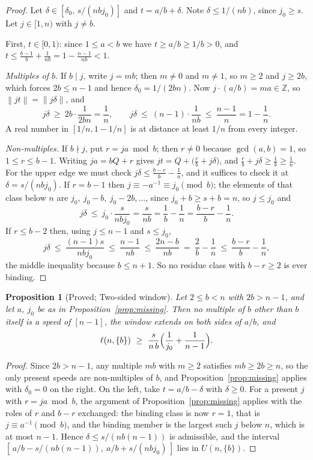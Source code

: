 \documentclass[11pt]{amsart}
\theoremstyle{plain}
\newtheorem{proposition}[theorem]{Proposition}
\theoremstyle{definition}
\newcommand{\nrm}[1]{\left\lVert #1 \right\rVert}
\newcommand{\Z}{\mathbb{Z}}
\begin{document}
\begin{proof}
Let $\delta\in[\delta_0,\,s/(nbj_0)]$ and $t=a/b+\delta$. Note $\delta\le 1/(nb)$, since $j_0\ge s$.
Let $j\in[1,n)$ with $j\ne b$.

First, $t\in[0,1)$: since $1\le a<b$ we have $t\ge a/b\ge 1/b>0$, and
$t\le\frac{b-1}{b}+\frac{1}{nb}=1-\frac{n-1}{nb}<1$.

\emph{Multiples of $b$.} If $b\mid j$, write $j=mb$; then $m\ne0$ and $m\ne1$, so $m\ge2$ and
$j\ge 2b$, which forces $2b\le n-1$ and hence $\delta_0=1/(2bn)$. Now $j\cdot(a/b)=ma\in\Z$, so
$\nrm{jt}=\nrm{j\delta}$, and
\[
  j\delta\ \ge\ 2b\cdot\frac{1}{2bn}=\frac1n,
  \qquad
  j\delta\ \le\ (n-1)\cdot\frac{1}{nb}\ \le\ \frac{n-1}{n}=1-\frac1n .
\]
A real number in $[1/n,1-1/n]$ is at distance at least $1/n$ from every integer.

\emph{Non-multiples.} If $b\nmid j$, put $r=ja\bmod b$; then $r\ne0$ because $\gcd(a,b)=1$, so
$1\le r\le b-1$. Writing $ja=bQ+r$ gives $jt=Q+\bigl(\tfrac rb+j\delta\bigr)$, and
$\tfrac rb+j\delta\ge\tfrac1b\ge\tfrac1n$. For the upper edge we must check
$j\delta\le\frac{b-r}{b}-\frac1n$, and it suffices to check it at $\delta=s/(nbj_0)$.
If $r=b-1$ then $j\equiv -a^{-1}\equiv j_0\pmod b$; the elements of that class below $n$ are
$j_0,\ j_0-b,\ j_0-2b,\dots$, since $j_0+b\ge s+b=n$, so $j\le j_0$ and
\[
  j\delta\ \le\ j_0\cdot\frac{s}{nbj_0}=\frac{s}{nb}=\frac1b-\frac1n=\frac{b-r}{b}-\frac1n .
\]
If $r\le b-2$ then, using $j\le n-1$ and $s\le j_0$,
\[
  j\delta\ \le\ \frac{(n-1)s}{nbj_0}\ \le\ \frac{n-1}{nb}
  \ \le\ \frac{2n-b}{nb}\ =\ \frac2b-\frac1n\ \le\ \frac{b-r}{b}-\frac1n ,
\]
the middle inequality because $b\le n+1$. So no residue class with $b-r\ge2$ is ever binding.
\end{proof}

\begin{proposition}[Proved; Two-sided window]\label{prop:twosided}
Let $2\le b<n$ with $2b>n-1$, and let $a$, $j_0$ be as in Proposition~\ref{prop:missing}. Then no
multiple of $b$ other than $b$ itself is a speed of $[n-1]$, the window extends on both sides of
$a/b$, and
\[
  \ell(n,\{b\})\ \ge\ \frac{s}{n\,b}\Bigl(\frac1{j_0}+\frac1{n-1}\Bigr).
\]
\end{proposition}

\begin{proof}
Since $2b>n-1$, any multiple $mb$ with $m\ge2$ satisfies $mb\ge 2b\ge n$, so the only present speeds
are non-multiples of $b$, and Proposition~\ref{prop:missing} applies with $\delta_0=0$ on the right.
On the left, take $t=a/b-\delta$ with $\delta\ge0$. For a present $j$ with $r=ja\bmod b$, the
argument of Proposition~\ref{prop:missing} applies with the roles of $r$ and $b-r$ exchanged: the
binding class is now $r=1$, that is $j\equiv a^{-1}\pmod b$, and the binding member is the largest
such $j$ below $n$, which is at most $n-1$. Hence $\delta\le s/(nb(n-1))$ is admissible, and the
interval $[\,a/b-s/(nb(n-1)),\ a/b+s/(nbj_0)\,]$ lies in $U(n,\{b\})$.
\end{proof}
\end{document}
